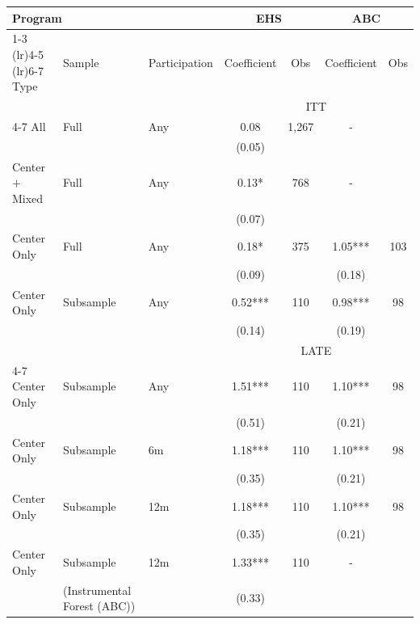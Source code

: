 \begin{tabular}{lllcccc}
\toprule 
\midrule 
\multicolumn{3}{l}{Program} & \multicolumn{2}{c}{EHS} & \multicolumn{2}{c}{ABC} \\
 \cmidrule(lr){1-3} \cmidrule(lr){4-5} \cmidrule(lr){6-7} 
Type & Sample & Participation & Coefficient & Obs & Coefficient & Obs \\
\midrule 
\multicolumn{3}{c}{} & \multicolumn{4}{c}{ITT} \\
 \cmidrule(lr){4-7} 
All & Full & Any & 0.08 & 1,267 & - \\
 &  &  & (0.05) &  \\
Center $+$ Mixed & Full & Any & 0.13* & 768 & - \\
 &  &  & (0.07) &  \\
Center Only & Full & Any & 0.18* & 375 & 1.05*** & 103 \\
 &  &  & (0.09) &  & (0.18) &  \\
Center Only & Subsample & Any & 0.52*** & 110 & 0.98*** & 98 \\
 &  &  & (0.14) &  & (0.19) &  \\
\midrule 
\multicolumn{3}{c}{} & \multicolumn{4}{c}{LATE} \\
 \cmidrule(lr){4-7} 
Center Only & Subsample & Any & 1.51*** & 110 & 1.10*** & 98 \\
 &  &  & (0.51) &  & (0.21) &  \\
Center Only & Subsample & 6m & 1.18*** & 110 & 1.10*** & 98 \\
 &  &  & (0.35) &  & (0.21) &  \\
Center Only & Subsample & 12m & 1.18*** & 110 & 1.10*** & 98 \\
 &  &  & (0.35) &  & (0.21) &  \\
Center Only & Subsample & 12m & 1.33*** & 110 & - \\
 & (Instrumental Forest (ABC)) &  & (0.33) &  \\
\midrule 
\bottomrule 
\end{tabular}
